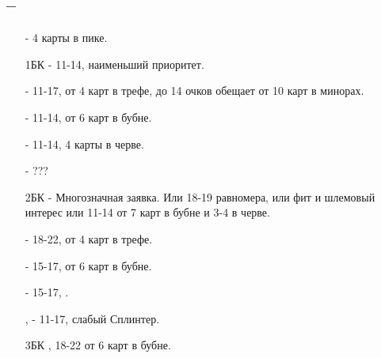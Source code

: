 \documentclass{article}
\begin{document}
\subsection{ -- }
\begin{enumerate}
    \item[\sp{1}] - 4 карты в пике.
    \item[1БК] - 11-14, наименьший приоритет.
    \item[\cl{2}] - 11-17, от 4 карт в трефе, до 14 очков обещает от 10 карт в минорах. 
    \item[\di{2}] - 11-14, от 6 карт в бубне.
    \item[\he{2}] - 11-14, 4 карты в черве.
    \item[\sp{2}] - ???
    \item[2БК] - Многозначная заявка. Или 18-19 равномера, или фит и шлемовый интерес или 11-14 от 7 карт в бубне и 3-4 в черве.
    \item[\cl{3}] - 18-22, от 4 карт в трефе.
    \item[\di{3}] - 15-17, от 6 карт в бубне.
    \item[\he{3}] - 15-17, .
    \item[\sp{3}, \cl{4}] - 11-17, слабый Сплинтер.
    \item[3БК], 18-22 от 6 карт в бубне.
\end{enumerate}
\end{document}
